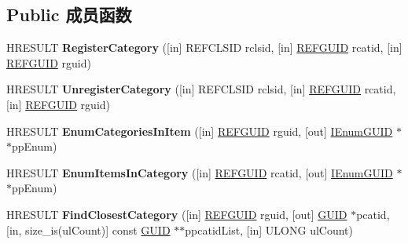 \subsection*{Public 成员函数}
\begin{DoxyCompactItemize}
\item 
\mbox{\label{interface_i_tf_category_mgr_a9fdfc02937055e088b878f2d922f6db5}} 
H\+R\+E\+S\+U\+LT {\bfseries Register\+Category} (\mbox{[}in\mbox{]} R\+E\+F\+C\+L\+S\+ID rclsid, \mbox{[}in\mbox{]} \hyperlink{struct___g_u_i_d}{R\+E\+F\+G\+U\+ID} rcatid, \mbox{[}in\mbox{]} \hyperlink{struct___g_u_i_d}{R\+E\+F\+G\+U\+ID} rguid)
\item 
\mbox{\label{interface_i_tf_category_mgr_ab26287ea499ff7133daef428486ecaad}} 
H\+R\+E\+S\+U\+LT {\bfseries Unregister\+Category} (\mbox{[}in\mbox{]} R\+E\+F\+C\+L\+S\+ID rclsid, \mbox{[}in\mbox{]} \hyperlink{struct___g_u_i_d}{R\+E\+F\+G\+U\+ID} rcatid, \mbox{[}in\mbox{]} \hyperlink{struct___g_u_i_d}{R\+E\+F\+G\+U\+ID} rguid)
\item 
\mbox{\label{interface_i_tf_category_mgr_a3aabefe72239170a1d126092d8f4f580}} 
H\+R\+E\+S\+U\+LT {\bfseries Enum\+Categories\+In\+Item} (\mbox{[}in\mbox{]} \hyperlink{struct___g_u_i_d}{R\+E\+F\+G\+U\+ID} rguid, \mbox{[}out\mbox{]} \hyperlink{interface_i_enum_g_u_i_d}{I\+Enum\+G\+U\+ID} $\ast$$\ast$pp\+Enum)
\item 
\mbox{\label{interface_i_tf_category_mgr_a8d094b2349d25a8827acd476b4eebc70}} 
H\+R\+E\+S\+U\+LT {\bfseries Enum\+Items\+In\+Category} (\mbox{[}in\mbox{]} \hyperlink{struct___g_u_i_d}{R\+E\+F\+G\+U\+ID} rcatid, \mbox{[}out\mbox{]} \hyperlink{interface_i_enum_g_u_i_d}{I\+Enum\+G\+U\+ID} $\ast$$\ast$pp\+Enum)
\item 
\mbox{\label{interface_i_tf_category_mgr_a233102349affdfe73999ebe0b11ec249}} 
H\+R\+E\+S\+U\+LT {\bfseries Find\+Closest\+Category} (\mbox{[}in\mbox{]} \hyperlink{struct___g_u_i_d}{R\+E\+F\+G\+U\+ID} rguid, \mbox{[}out\mbox{]} \hyperlink{interface_g_u_i_d}{G\+U\+ID} $\ast$pcatid, \mbox{[}in, size\+\_\+is(ul\+Count)\mbox{]} const \hyperlink{interface_g_u_i_d}{G\+U\+ID} $\ast$$\ast$ppcatid\+List, \mbox{[}in\mbox{]} U\+L\+O\+NG ul\+Count)
\item 
$$
\end{DoxyCompactItemize}
